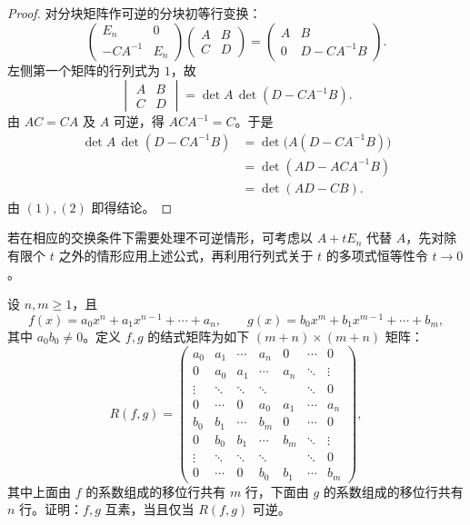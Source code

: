 \begin{proof}
	对分块矩阵作可逆的分块初等行变换：
	\[
	\begin{pmatrix}
		E_n&0\\
		-CA^{-1}&E_n
	\end{pmatrix}
	\begin{pmatrix}
		A&B\\
		C&D
	\end{pmatrix}
	=
	\begin{pmatrix}
		A&B\\
		0&D-CA^{-1}B
	\end{pmatrix}.
	\]
	左侧第一个矩阵的行列式为 $1$，故
	\begin{equation}\tag{1}
		\begin{vmatrix}
			A&B\\
			C&D
		\end{vmatrix}
		=\det A\,\det(D-CA^{-1}B).
	\end{equation}
	由 $AC=CA$ 及 $A$ 可逆，得 $ACA^{-1}=C$。于是
	\begin{equation}\tag{2}
		\begin{aligned}
			\det A\,\det(D-CA^{-1}B)
			&=\det\bigl(A(D-CA^{-1}B)\bigr)\\
			&=\det(AD-ACA^{-1}B)\\
			&=\det(AD-CB).
		\end{aligned}
	\end{equation}
	由 $(1),(2)$ 即得结论。
\end{proof}

\begin{remark}
	若在相应的交换条件下需要处理不可逆情形，可考虑以 $A+tE_n$ 代替 $A$，先对除有限个 $t$ 之外的情形应用上述公式，再利用行列式关于 $t$ 的多项式恒等性令 $t\to0$。
\end{remark}

\begin{problem}
 设 $n,m\geq1$，且
	\[
	f(x)=a_0x^n+a_1x^{n-1}+\cdots+a_n,
	\qquad
	g(x)=b_0x^m+b_1x^{m-1}+\cdots+b_m,
	\]
	其中 $a_0b_0\neq0$。定义 $f,g$ 的结式矩阵为如下 $(m+n)\times(m+n)$ 矩阵：
	\[
	R(f,g)=
	\begin{pmatrix}
		a_0&a_1&\cdots&a_n&0&\cdots&0\\
		0&a_0&a_1&\cdots&a_n&\ddots&\vdots\\
		\vdots&\ddots&\ddots&\ddots&&\ddots&0\\
		0&\cdots&0&a_0&a_1&\cdots&a_n\\[2mm]
		b_0&b_1&\cdots&b_m&0&\cdots&0\\
		0&b_0&b_1&\cdots&b_m&\ddots&\vdots\\
		\vdots&\ddots&\ddots&\ddots&&\ddots&0\\
		0&\cdots&0&b_0&b_1&\cdots&b_m
	\end{pmatrix},
	\]
	其中上面由 $f$ 的系数组成的移位行共有 $m$ 行，下面由 $g$ 的系数组成的移位行共有 $n$ 行。证明：$f,g$ 互素，当且仅当 $R(f,g)$ 可逆。
\end{problem}


